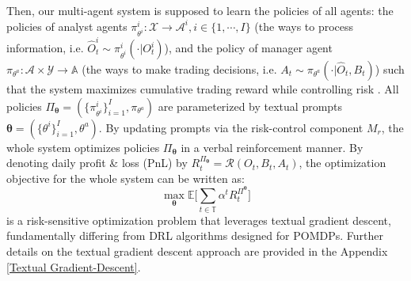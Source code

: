 Then, our multi-agent system is supposed to learn the policies of all agents: the policies of analyst agents $\pi_{\theta^i}^i:\mathcal{X}\to\mathcal{A}^i, i\in\{1,\cdots, I\}$ ({the ways to process information, i.e. $\hat{O}_t^i\sim\pi_{\theta^i}^i(\cdot|O_t^{i})$}), and the policy of manager agent $\pi_{\theta^a}:\mathcal{A}\times\mathcal{Y}\to \mathbb{A}$ ({the ways to make trading decisions, i.e. $A_t\sim\pi_{\theta^a}(\cdot|\hat{O}_t,B_t)$}) such that the system maximizes cumulative trading reward while controlling risk \cite{rao2022foundations}. All policies $\Pi_{\bm{\theta}}=(\{\pi_{\theta^i}^i\}_{i=1}^I,\pi_{\theta^a})$ are parameterized by textual prompts $\bm{\theta}=(\{\theta^i\}_{i=1}^I,\theta^a)$. By updating prompts via the risk-control component $M_r$, the whole system optimizes policies $\Pi_{\bm{\theta}}$ in a verbal reinforcement manner. By denoting daily profit \& loss (PnL) by $R^{\Pi_{\bm{\theta}}}_t=\mathcal{R}(O_t, B_t, A_t)$, the optimization objective for the whole system can be written as:
\begin{equation} \label{objective}
\max_{\bm{\theta}}\mathbb{E}\Big[\sum\limits_{t\in\mathbb{T}}\alpha^tR^{\Pi^{\bm{\theta}}}_t\Big]
\end{equation}
is a risk-sensitive optimization problem that leverages textual gradient descent, fundamentally differing from DRL algorithms designed for POMDPs. Further details on the textual gradient descent approach are provided in the Appendix \ref{Textual Gradient-Descent}.
